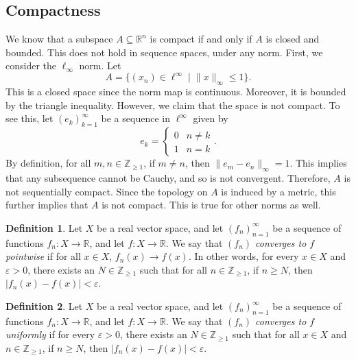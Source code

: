 \documentclass[a4paper, openany]{memoir}
\theoremstyle{definition}
\newtheorem{definition}{Definition}[section]
\theoremstyle{plain}
\begin{document}
\subsection{Compactness}
We know that a subspace $A \subseteq \mathbb{R}^n$ is compact if and only if $A$ is closed and bounded. This does not hold in sequence spaces, under any norm. First, we consider the $\ell_\infty$ norm. Let
\[A = \{(x_n) \in \ell^\infty \mid \lVert x \rVert_\infty \leq 1\}.\]
This is a closed space since the norm map is continuous. Moreover, it is bounded by the triangle inequality. However, we claim that the space is not compact. To see this, let $(e_k)_{k=1}^\infty$ be a sequence in $\ell^\infty$ given by
\[e_k = \begin{cases}
    0 & n \neq k \\
    1 & n = k
\end{cases}.\]
By definition, for all $m, n \in \mathbb{Z}_{\geq 1}$, if $m \neq n$, then $\lVert e_m - e_n \rVert_\infty = 1$. This implies that any subsequence cannot be Cauchy, and so is not convergent. Therefore, $A$ is not sequentially compact. Since the topology on $A$ is induced by a metric, this further implies that $A$ is not compact. This is true for other norms as well.


\begin{definition}
    Let $X$ be a real vector space, and let $(f_n)_{n=1}^\infty$ be a sequence of functions $f_n: X \to \mathbb{R}$, and let $f: X \to \mathbb{R}$. We say that \emph{$(f_n)$ converges to $f$ pointwise} if for all $x \in X$, $f_n(x) \to f(x)$. In other words, for every $x \in X$ and $\varepsilon > 0$, there exists an $N \in \mathbb{Z}_{\geq 1}$ such that for all $n \in \mathbb{Z}_{\geq 1}$, if $n \geq N$, then $|f_n(x) - f(x)| < \varepsilon$.
\end{definition}

\begin{definition}
    Let $X$ be a real vector space, and let $(f_n)_{n=1}^\infty$ be a sequence of functions $f_n: X \to \mathbb{R}$, and let $f: X \to \mathbb{R}$. We say that \emph{$(f_n)$ converges to $f$ uniformly} if for every $\varepsilon > 0$, there exists an $N \in \mathbb{Z}_{\geq 1}$ such that for all $x \in X$ and $n \in \mathbb{Z}_{\geq 1}$, if $n \geq N$, then $|f_n(x) - f(x)| < \varepsilon$.
\end{definition}
\end{document}
